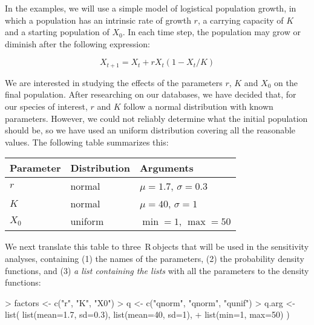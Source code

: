 \documentclass[12pt,a4paper]{article}
\newcommand{\R}{{\sf \,R\,}} %
\begin{document}
In the examples, we will use a simple model of logistical population growth, 
in which a population
has an intrinsic rate of growth $r$, a carrying capacity of $K$ and a 
starting population of $X_0$. In each time step, the population may grow
or diminish after the following expression:

\begin{equation}
		X_{t+1} = X_t + r X_t \left(1-X_t/K \right)
\end{equation}

We are interested in studying the effects of the parameters $r$, $K$
and $X_0$ on the final population. After researching on our databases,
we have decided that, for our species of interest, $r$ and $K$ follow
a normal distribution with known parameters. However, we could not
reliably determine what the initial population should be, so we
have used an uniform distribution covering all the reasonable values.
The following table summarizes this:

		\begin{center}
		\begin{tabular}{l l l}
				\hline
				Parameter & Distribution & Arguments\\
				\hline
				$r$ & normal & $\mu = 1.7$, $\sigma=0.3$ \\
				$K$ & normal & $\mu = 40$, $\sigma=1$ \\
				$X_0$ & uniform & $\min = 1$, $\max=50$ \\
				\hline
		\end{tabular}
		\end{center}

We next translate this table to three \R objects that will be used
in the sensitivity analyses, containing (1) the names of the parameters, (2) 
the probability density functions, and (3) {\em a list containing the lists} with 
all the parameters to the density functions:

\begin{Schunk}
\begin{Sinput}
> factors <- c("r", "K", "X0")
> q <- c("qnorm", "qnorm", "qunif")
> q.arg <- list( list(mean=1.7, sd=0.3), list(mean=40, sd=1), 
+ 	list(min=1, max=50) )
\end{Sinput}
\end{Schunk}
\end{document}

